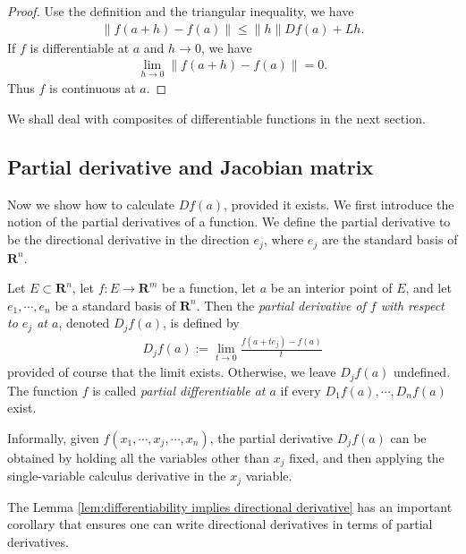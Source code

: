 \begin{proof}
    Use the definition and the triangular inequality, we have
        \begin{align*}
            \|f(a + h) - f(a)\|
            \leq \|h\|Df(a) + Lh.
        \end{align*}
    If $f$ is differentiable at $a$ and $h \to 0$, we have
        \begin{align*}
            \lim_{h \to 0}\|f(a + h) - f(a)\| = 0.
        \end{align*}
    Thus $f$ is continuous at $a$.
\end{proof}

We shall deal with composites of differentiable functions in the next section.

\subsection{Partial derivative and Jacobian matrix}
Now we show how to calculate $Df(a)$, provided it exists. We first introduce the notion of the partial derivatives of a function. We define the partial derivative to be the directional derivative in the direction $e_j$, where $e_j$ are the standard basis of $\mathbf{R}^n$.

\begin{definition}
    Let $E \subset \mathbf{R}^n$, let $f : E \to \mathbf{R}^m$ be a function, let $a$ be an interior point of $E$, and let $e_1, \cdots, e_n$ be a standard basis of $\mathbf{R}^n$. Then the \emph{partial derivative of $f$ with respect to $e_j$ at $a$}, denoted $D_jf(a)$, is defined by
        \begin{align*}
            D_jf(a) := \lim_{t \to 0}\frac{f(a + te_j) - f(a)}{t}
        \end{align*}
    provided of course that the limit exists. Otherwise, we leave $D_jf(a)$ undefined. The function $f$ is called \emph{partial differentiable at $a$} if every $D_1f(a), \cdots, D_nf(a)$ exist.
\end{definition}

\begin{remark}
    Informally, given $f(x_1, \cdots, x_j, \cdots, x_n)$, the partial derivative $D_jf(a)$ can be obtained by holding all the variables other than $x_j$ fixed, and then applying the single-variable calculus derivative in the $x_j$ variable.
\end{remark}

The Lemma \ref{lem:differentiability implies directional derivative} has an important corollary that ensures one can write directional derivatives in terms of partial derivatives.

